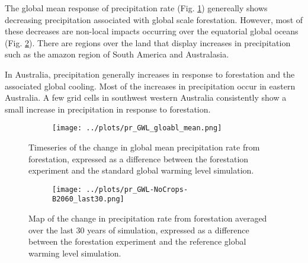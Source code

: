 \documentclass[]{article}
\begin{document}
The global mean response of precipitation rate (Fig. \ref{fig:global_pr_timeseries})
genereally shows decreasing precipitation associated with global scale forestation.
However, most of these decreases are non-local impacts occurring over the equatorial global oceans (Fig. \ref{fig:pr_map}).
There are regions over the land that display increases in precipitation such as the amazon region of South America and Australasia.

In Australia, precipitation generally increases in response to forestation and the associated global cooling.
Most of the increases in precipitation occur in eastern Australia.
A few grid cells in southwest western Australia consistently show a small increase in precipitation in response to forestation.

\begin{figure}[H]
    \centering
    \begin{subfigure}[b]{\linewidth}
        \texttt{[image: ../plots/pr\_GWL\_gloabl\_mean.png]}
    \end{subfigure}
    \caption{Timeseries of the change in global mean precipitation rate from forestation, expressed as a difference between the forestation experiment and the standard global warming level simulation.}
    \label{fig:global_pr_timeseries}
\end{figure}

\begin{figure}[H]
    \centering
    \begin{subfigure}[b]{\linewidth}
        \texttt{[image: ../plots/pr\_GWL-NoCrops-B2060\_last30.png]}
    \end{subfigure}
    \caption{Map of the change in precipitation rate from forestation averaged over the last 30 years of simulation, expressed as a difference between the forestation experiment and the reference global warming level simulation.}
    \label{fig:pr_map}
\end{figure}
\end{document}
